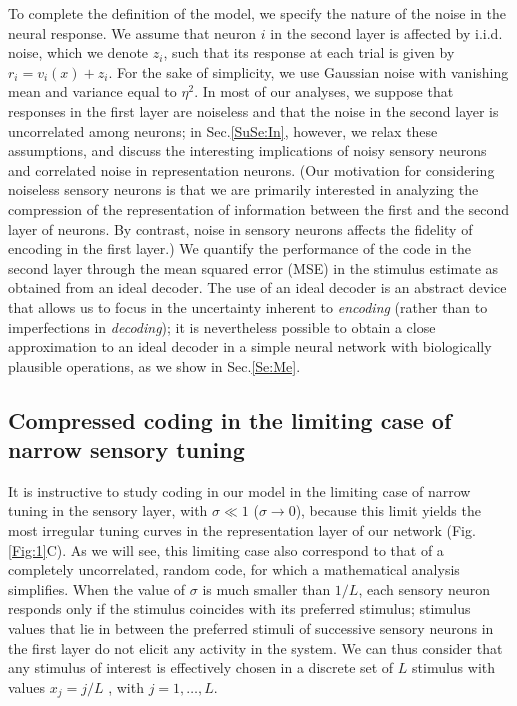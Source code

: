 \documentclass[a4paper]{article}%
\begin{document}
To complete the definition of the model, we specify the nature of the noise in
the neural response. We assume that neuron $i$ in the second layer is affected
by i.i.d. noise, which we denote $z_{i}$, such that its response at each trial is
given by $r_{i}=v_{i}\left(  x\right)  +z_{i}$. For the sake of simplicity, we
use Gaussian noise with vanishing mean and variance equal to $\eta^{2}$. In
most of our analyses, we suppose that responses in the first layer are
noiseless and that the noise in the second layer is uncorrelated among
neurons; in Sec.\ref{SuSe:In}, however, we relax these assumptions, and
discuss the interesting implications of noisy sensory neurons and correlated
noise in representation neurons. (Our motivation for considering noiseless
sensory neurons is that we are primarily interested in analyzing the
compression of the representation of information between the first and the
second layer of neurons. By contrast, noise in sensory neurons affects the
fidelity of encoding in the first layer.) We quantify the performance of the
code in the second layer through the mean squared error (MSE) in the stimulus
estimate as obtained from an ideal decoder. The use of an ideal decoder is an
abstract device that allows us to focus in the uncertainty inherent to
\textit{encoding} (rather than to imperfections in \textit{decoding}); it is
nevertheless possible to obtain a close approximation to an ideal decoder in a
simple neural network with biologically plausible operations, as we show in
Sec.\ref{Se:Me}.

\subsection{Compressed coding in the limiting case of narrow sensory tuning}

It is instructive to study coding in our model in the limiting case of narrow
tuning in the sensory layer, with $\sigma\ll1$ ($\sigma\rightarrow0$), because
this limit yields the most irregular tuning curves in the representation layer
of our network (Fig. \ref{Fig:1}C). As we will see, this limiting case also
correspond to that of a completely uncorrelated, random code, for which a
mathematical analysis simplifies. When the value of $\sigma$ is much smaller
than $1/L$, each sensory neuron responds only if the stimulus coincides with
its preferred stimulus; stimulus values that lie in between the preferred
stimuli of successive sensory neurons in the first layer do not elicit any
activity in the system. We can thus consider that any stimulus of interest is
effectively chosen in a discrete set of $L$ stimulus with values $x_{j}=j/L$ ,
with $j=1,\ldots,L$.
\end{document}
